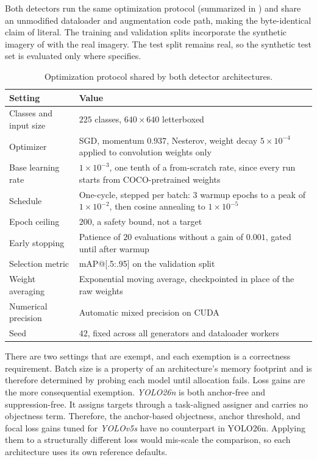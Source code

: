 Both detectors run the same optimization protocol (summarized in ) and share an unmodified dataloader and augmentation code path, making the byte-identical claim of  literal. The training and validation splits incorporate the synthetic imagery of  with the real imagery. The test split remains real, so the  synthetic test set is evaluated only where  specifies.

\begin{table}[htbp]
\centering
\caption{Optimization protocol shared by both detector architectures.}
\label{tab:training-protocol}
\begin{tabularx}{\textwidth}{@{}lX@{}}
\toprule
Setting & Value \\
\midrule
Classes and input size & $225$ classes, $640 \times 640$ letterboxed \\
Optimizer & SGD, momentum $0.937$, Nesterov, weight decay $5 \times 10^{-4}$ applied to convolution weights only \\
Base learning rate & $1 \times 10^{-3}$, one tenth of a from-scratch rate, since every run starts from COCO-pretrained weights \\
Schedule & One-cycle, stepped per batch: $3$ warmup epochs to a peak of $1 \times 10^{-2}$, then cosine annealing to $1 \times 10^{-5}$ \\
Epoch ceiling & $200$, a safety bound, not a target \\
Early stopping & Patience of $20$ evaluations without a gain of $0.001$, gated until after warmup \\
Selection metric & mAP@[.5:.95] on the validation split \\
Weight averaging & Exponential moving average, checkpointed in place of the raw weights \\
Numerical precision & Automatic mixed precision on CUDA \\
Seed & $42$, fixed across all generators and dataloader workers \\
\bottomrule
\end{tabularx}
\end{table}

There are two settings that are exempt, and each exemption is a correctness requirement. Batch size is a property of an architecture's memory footprint and is therefore determined by probing each model until allocation fails. Loss gains are the more consequential exemption. \textit{YOLO26n} is both anchor-free and suppression-free. It assigns targets through a task-aligned assigner and carries no objectness term. Therefore, the anchor-based objectness, anchor threshold, and focal loss gains tuned for \textit{YOLOv5s} have no counterpart in YOLO26n. Applying them to a structurally different loss would mis-scale the comparison, so each architecture uses its own reference defaults.


